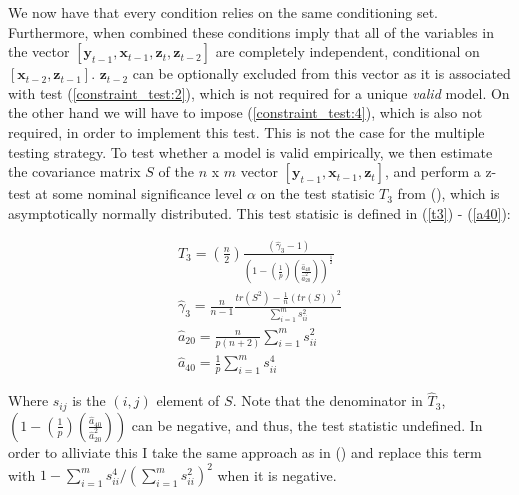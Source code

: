 \documentclass{article}
\begin{document}
We now have that every condition relies on the same conditioning set. Furthermore, when combined these conditions imply that all of the variables in the vector $[\mathbf{y}_{t-1}, \mathbf{x}_{t-1}, \mathbf{z}_{t}, \mathbf{z}_{t-2}]$ are completely independent, conditional on $[\mathbf{x}_{t-2}, \mathbf{z}_{t-1}]$. $\mathbf{z}_{t-2}$ can be optionally excluded from this vector as it is associated with test (\ref{constraint_test:2}), which is not required for a unique \textit{valid} model. On the other hand we will have to impose (\ref{constraint_test:4}), which is also not required, in order to implement this test. This is not the case for the multiple testing strategy. To test whether a model is valid empirically, we then estimate the covariance matrix $S$ of the $n$ x $m$ vector $[\mathbf{y}_{t-1}, \mathbf{x}_{t-1}, \mathbf{z}_{t}]$, and perform a z-test at some nominal significance level $\alpha$ on the test statisic $T_3$ from \citeauthor{srivastava2005some} (\citeyear{srivastava2005some}), which is asymptotically normally distributed. This test statisic is defined in (\ref{t3}) - (\ref{a40}):

\begin{align}
  \hat{T}_3 = \left(\frac{n}2{}\right)\frac{(\hat{\gamma}_3-1)}{\left(1-\left(\frac{1}{p}\right)\left(\frac{\hat{a}_{40}}{\hat{a}^2_{20}}\right)\right)^\frac{1}{2}} \label{t3} \\
  \hat{\gamma}_3 = \frac{n}{n-1}\frac{tr(S^2) - \frac{1}{n}(tr(S))^2}{\sum_{i=1}^ms^2_{ii}} \\
  \hat{a}_{20} = \frac{n}{p(n+2)}\sum_{i=1}^ms^2_{ii} \\
  \hat{a}_{40} = \frac{1}{p}\sum_{i=1}^ms^4_{ii} \label{a40}
\end{align}

Where $s_{ij}$ is the $(i,j)$ element of $S$. Note that the denominator in $\hat{T}_3$, $\left(1-\left(\frac{1}{p}\right)\left(\frac{\hat{a}_{40}}{\hat{a}^2_{20}}\right)\right)$ can be negative, and thus, the test statistic undefined. In order to alliviate this I take the same approach as in \citeauthor{wang2013necessary} (\citeyear{wang2013necessary}) and replace this term with $1-\sum_{i=1}^ms^4_{ii}/\left(\sum_{i=1}^ms^2_{ii}\right)^2$ when it is negative.
\end{document}
